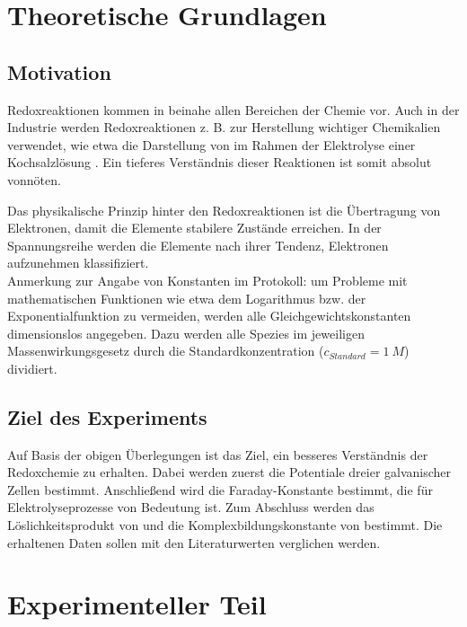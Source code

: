 \documentclass{article}
\begin{document}
  \pagebreak
  
  \section{Theoretische Grundlagen}
  
    \subsection{Motivation} \label{sec:Motivation}
      
      Redoxreaktionen kommen in beinahe allen Bereichen der Chemie vor. Auch in der Industrie werden Redoxreaktionen z. B. zur Herstellung wichtiger Chemikalien verwendet, wie etwa die Darstellung von  im Rahmen der Elektrolyse einer Kochsalzlösung \cite{NaOHDarstellung}. Ein tieferes Verständnis dieser Reaktionen ist somit absolut vonnöten. 
      
      Das physikalische Prinzip hinter den Redoxreaktionen ist die Übertragung von Elektronen, damit die Elemente stabilere Zustände erreichen. In der Spannungsreihe werden die Elemente nach ihrer Tendenz, Elektronen aufzunehmen klassifiziert. \\
      
      Anmerkung zur Angabe von Konstanten im Protokoll: um Probleme mit mathematischen Funktionen wie etwa dem Logarithmus bzw. der Exponentialfunktion zu vermeiden, werden alle Gleichgewichtskonstanten dimensionslos angegeben. Dazu werden alle Spezies im jeweiligen Massenwirkungsgesetz durch die Standardkonzentration ($c_{Standard} = \SI[mode=text]{1}{M}$) dividiert.
  
    \subsection{Ziel des Experiments}
    
      Auf Basis der obigen Überlegungen ist das Ziel, ein besseres Verständnis der Redoxchemie zu erhalten. Dabei werden zuerst die Potentiale dreier galvanischer Zellen bestimmt. Anschließend wird die Faraday-Konstante bestimmt, die für Elektrolyseprozesse von Bedeutung ist. Zum Abschluss werden das Löslichkeitsprodukt von  und die Komplexbildungskonstante von \ch{[Cu(NH3)4]\pch[2]} bestimmt. Die erhaltenen Daten sollen mit den Literaturwerten verglichen werden. 
    
  \section{Experimenteller Teil}
  
\end{document}
